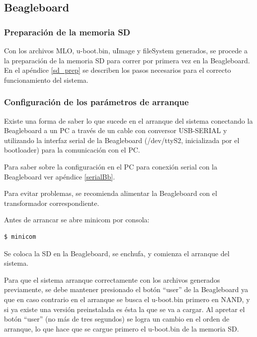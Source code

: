 \subsection{Beagleboard}

\subsubsection{Preparación de la memoria SD}

Con los archivos MLO, u-boot.bin, uImage y fileSystem generados, se procede a la preparación de la memoria SD para correr por primera vez en la Beagleboard. En el apéndice \ref{sd_prep} se describen los pasos necesarios para el correcto funcionamiento del sistema.


\subsubsection{Configuración de los parámetros de arranque}

Existe una forma de saber lo que sucede en el arranque del sistema conectando la Beagleboard a un PC a través de un cable con conversor USB-SERIAL y utilizando la interfaz serial de la Beagleboard (/dev/ttyS2, inicializada por el bootloader) para la comunicación con el PC.

\bigskip
Para saber sobre la configuración en el PC para conexión serial con la Beagleboard ver apéndice \ref{serialBb}.

\bigskip
{}

\bigskip
Para evitar problemas, se recomienda alimentar la Beagleboard con el transformador correspondiente.

\bigskip
Antes de arrancar se abre minicom por consola: 

\bigskip
\begin{verbatim}
$ minicom
\end{verbatim}

Se coloca la SD en la Beagleboard, se enchufa, y comienza el arranque del sistema. 

Para que el sistema arranque correctamente con los archivos generados previamente, se debe mantener presionado el botón “user” de la Beagleboard ya que en caso contrario en el arranque se busca el u-boot.bin primero en NAND, y si ya existe una versión preinstalada es ésta la que se va a cargar. Al apretar el botón “user” (no más de tres segundos) se logra un cambio en el orden de arranque, lo que hace que se cargue primero el u-boot.bin de la memoria SD.

